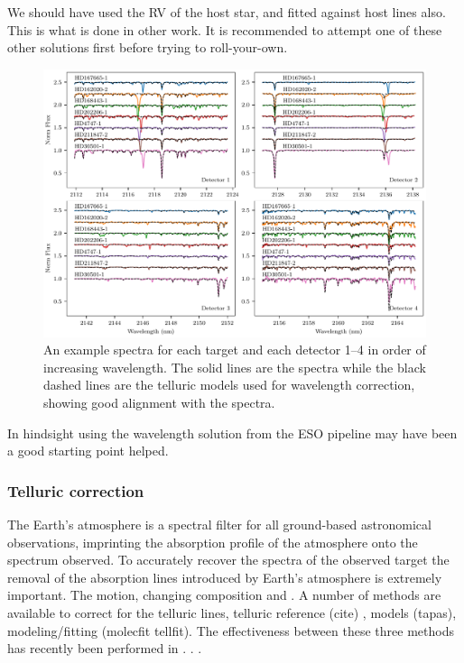 We should have used the RV of the host star, and fitted against host lines also. This is what is done in other work. It is recommended to attempt one of these other solutions first before trying to roll-your-own.

\begin{figure}
    \centering
    \includegraphics[width=1\linewidth]{figures/reduction/Spectra_examples}
    \caption{An example spectra for each target and each detector 1--4 in order of increasing wavelength. The solid lines are the spectra while the black dashed lines are the telluric models used for wavelength correction, showing good alignment with the spectra.}
    \label{fig:spectraexamples}
\end{figure}







In hindsight using the wavelength solution from the ESO pipeline may have been a good starting point helped.

\subsubsection{Telluric correction}
\label{subsec:telluric_correction}
The Earth's atmosphere is a spectral filter for all ground-based astronomical observations, imprinting the absorption profile of the atmosphere onto the spectrum observed. To accurately recover the spectra of the observed target the removal of the absorption lines introduced by Earth's atmosphere is extremely important. The motion, changing composition and .
A number of methods are available to correct for the telluric lines, telluric reference (cite) , models (tapas), modeling/fitting (molecfit tellfit). The effectiveness between these three methods has recently been performed in \cite{ulmer-moll_telluric_2018}.   . .

